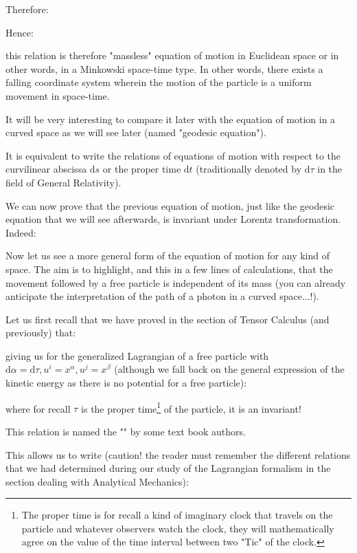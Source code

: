 	Therefore:
	
	Hence:
	
	this relation is therefore "massless" equation of motion in Euclidean space or in other words, in a Minkowski space-time type. In other words, there exists a falling coordinate system wherein the motion of the particle is a uniform movement in space-time.
	
	It will be very interesting to compare it later with the equation of motion in a curved space as we will see later (named "geodesic equation").
	\begin{tcolorbox}[title=Remark,colframe=black,arc=10pt]
	It is equivalent to write the relations of equations of motion with respect to the curvilinear abscissa $\mathrm{d}s$ or the proper time $\mathrm{d}t$ (traditionally denoted by $\mathrm{d}\tau$ in the field of General Relativity).
	\end{tcolorbox}
	We can now prove that the previous equation of motion, just like the geodesic equation that we will see afterwards, is invariant under Lorentz transformation. Indeed:
	
	Now let us see a more general form of the equation of motion for any kind of space. The aim is to highlight, and this in a few lines of calculations, that the movement followed by a free particle is independent of its mass (you can already anticipate the interpretation of the path of a photon in a curved space...!).

	Let us first recall that we have proved in the section of Tensor Calculus (and previously) that:
	
	giving us for the generalized Lagrangian of a free particle with $\mathrm{d}\alpha=\mathrm{d}\tau,u^i=x^\alpha,u^j=x^\beta$ (although we fall back on the general expression of the kinetic energy as there is no potential for a free particle):
	
	where for recall $\tau$ is the proper time\footnote{The proper time is for recall a kind of imaginary clock that travels on the particle and whatever observers watch the clock, they will mathematically agree on the value of the time interval between two "Tic" of the clock.} of the particle, it is an invariant!
	\begin{tcolorbox}[title=Remark,colframe=black,arc=10pt]
	This relation is named the "" by some text book authors.
	\end{tcolorbox}
	This allows us to write (caution! the reader must remember the different relations that we had determined during our study of the Lagrangian formalism in the section dealing with Analytical Mechanics):
	
